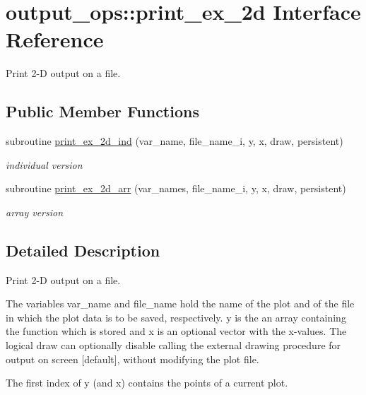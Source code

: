 \hypertarget{interfaceoutput__ops_1_1print__ex__2d}{}\section{output\+\_\+ops\+:\+:print\+\_\+ex\+\_\+2d Interface Reference}
\label{interfaceoutput__ops_1_1print__ex__2d}


Print 2-\/D output on a file.  


\subsection*{Public Member Functions}
\begin{DoxyCompactItemize}
\item 
subroutine \hyperlink{interfaceoutput__ops_1_1print__ex__2d_a72cb1fa0be48a610a27db6faba576b6c}{print\+\_\+ex\+\_\+2d\+\_\+ind} (var\+\_\+name, file\+\_\+name\+\_\+i, y, x, draw, persistent)
\begin{DoxyCompactList}\small\item\em individual version \end{DoxyCompactList}\item 
subroutine \hyperlink{interfaceoutput__ops_1_1print__ex__2d_ade45a02083c437f9264ed1500b1d1ea0}{print\+\_\+ex\+\_\+2d\+\_\+arr} (var\+\_\+names, file\+\_\+name\+\_\+i, y, x, draw, persistent)
\begin{DoxyCompactList}\small\item\em array version \end{DoxyCompactList}\end{DoxyCompactItemize}


\subsection{Detailed Description}
Print 2-\/D output on a file. 

The variables {\ttfamily var\+\_\+name} and {\ttfamily file\+\_\+name} hold the name of the plot and of the file in which the plot data is to be saved, respectively. {\ttfamily y} is the an array containing the function which is stored and {\ttfamily x} is an optional vector with the x-\/values. The logical {\ttfamily draw} can optionally disable calling the external drawing procedure for output on screen \mbox{[}default\mbox{]}, without modifying the plot file.

The first index of {\ttfamily y} (and {\ttfamily x}) contains the points of a current plot.

